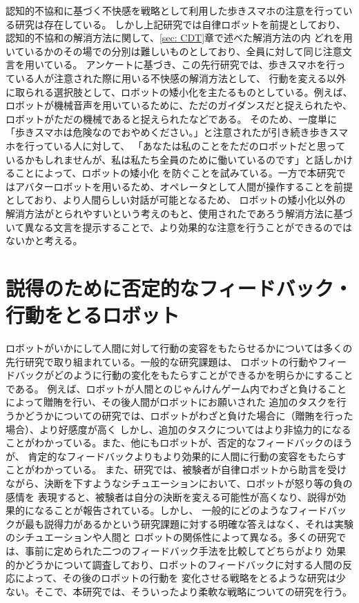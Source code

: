 \documentclass[11pt,a4j]{jreport}
\begin{document}
認知的不協和に基づく不快感を戦略として利用した歩きスマホの注意を行っている研究は存在している\cite{Schneider2022}。
しかし上記研究では自律ロボットを前提としており、認知的不協和の解消方法に関して、\ref{sec: CDT}章で述べた解消方法の内
どれを用いているかのその場での分別は難しいものとしており、全員に対して同じ注意文言を用いている。
アンケートに基づき、この先行研究では、歩きスマホを行っている人が注意された際に用いる不快感の解消方法として、
行動を変える以外に取られる選択肢として、ロボットの矮小化を主たるものとしている。例えば、
ロボットが機械音声を用いているために、ただのガイダンスだと捉えられたや、ロボットがただの機械であると捉えられたなどである。
そのため、一度単に「歩きスマホは危険なのでおやめください。」と注意されたが引き続き歩きスマホを行っている人に対して、
「あなたは私のことをただのロボットだと思っているかもしれませんが、私は私たち全員のために働いているのです」と話しかけることによって、ロボットの矮小化
を防ぐことを試みている。一方で本研究ではアバターロボットを用いるため、オペレータとして人間が操作することを前提としており、より人間らしい対話が可能となるため、
ロボットの矮小化以外の解消方法がとられやすいという考えのもと、使用されたであろう解消方法に基づいて異なる文言を提示することで、より効果的な注意を行うことができるのではないかと考える。

\section{説得のために否定的なフィードバック・行動をとるロボット}
ロボットがいかにして人間に対して行動の変容をもたらせるかについては多くの先行研究で取り組まれている。一般的な研究課題は、
ロボットの行動やフィードバックがどのように行動の変化をもたらすことができるかを明らかにすることである。
例えば、ロボットが人間とのじゃんけんゲーム内でわざと負けることによって贈賄を行い、その後人間がロボットにお願いされた
追加のタスクを行うかどうかについての研究\cite{sandoval2016can}では、ロボットがわざと負けた場合に（贈賄を行った場合）、より好感度が高く
しかし、追加のタスクについてはより非協力的になることがわかっている。また、他にもロボットが、否定的なフィードバックのほうが、
肯定的なフィードバックよりもより効果的に人間に行動の変容をもたらすことがわかっている\cite{Midden2009}。
また、研究\cite{paradeda2019makes}では、被験者が自律ロボットから助言を受けながら、決断を下すようなシチュエーションにおいて、ロボットが怒り等の負の感情を
表現すると、被験者は自分の決断を変える可能性が高くなり、説得が効果的になることが報告されている。しかし、
一般的にどのようなフィードバックが最も説得力があるかという研究課題に対する明確な答えはなく、それは実験のシチュエーションや人間と
ロボットの関係性によって異なる。多くの研究では、事前に定められた二つのフィードバック手法を比較してどちらがより
効果的かどうかについて調査しており、ロボットのフィードバックに対する人間の反応によって、その後のロボットの行動を
変化させる戦略をとるような研究は少ない。そこで、本研究では、そういったより柔軟な戦略についての研究を行う。
\end{document}
